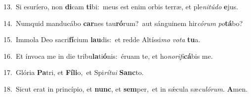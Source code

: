 {\numbfont\textcolor{\numbcolor}{13.}}~Si esuríero, non \textbf{di}\-cam \textbf{ti}\-bi:~\star meus est enim orbis terræ, et ple\-\textit{ni}\-\textit{tú}\textit{do} \textbf{e}\-jus.\par
{\numbfont\textcolor{\numbcolor}{14.}}~Numquid manducábo \textbf{car}\-nes tau\-\textbf{ró}\-rum?~\star aut sánguinem hir\-\textit{có}\-\textit{rum} \textit{po}\-\textbf{tá}bo?\par
{\numbfont\textcolor{\numbcolor}{15.}}~Immola Deo sacri\-\textbf{fí}\-cium \textbf{lau}\-dis:~\star et redde Altíssi\textit{mo} \textit{vo}\-\textit{ta} \textbf{tu}\-a.\par
{\numbfont\textcolor{\numbcolor}{16.}}~Et ínvoca me in die tribu\-\textbf{la}\-ti\-\textbf{ó}\-nis:~\star éruam te, et ho\-\textit{no}\-\textit{ri}\textit{fi}\textbf{cá}bis me.\par
{\numbfont\textcolor{\numbcolor}{17.}}~Glória \textbf{Pa}\-tri, et \textbf{Fí}\-\textbf{li}o,~\star et Spi\-\textit{rí}\-\textit{tu}\textit{i} \textbf{Sanc}\-to.\par
{\numbfont\textcolor{\numbcolor}{18.}}~Sicut erat in princípio, et \textbf{nunc}\-, et \textbf{sem}\-per,~\star et in sǽcula sæ\-\textit{cu}\-\textit{ló}\textit{rum}. \textbf{A}\-men.\par
